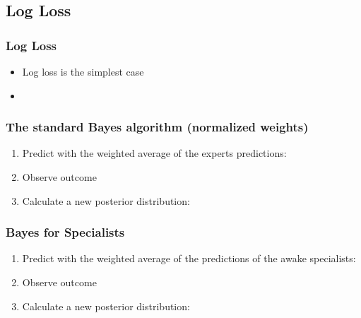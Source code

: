 \documentclass{beamer}
\begin{document}
\subsection{Log Loss}

\begin{frame}
\frametitle{Log Loss}
\begin{itemize}
\item Log loss is the simplest case
\item
\R{\[
\loss(\pred{},\outcome{}) =
  \begin{cases}
          - \ln \pred{}
        & if $\outcome{} = 1$ \cr
           - \ln (1-\pred{})
        & if $\outcome{} = 0$.
  \end{cases}
\]}
\end{itemize}
\end{frame}

\begin{frame}
\frametitle{The standard Bayes algorithm (normalized weights)}
{} 
\begin{enumerate}
 \item Predict with the weighted average of the experts
predictions:\newline
 \item Observe outcome 
 \item Calculate a new posterior distribution:
\R{\[
\pp{i}{t+1} = 
\begin{cases}
            \frac{{\displaystyle \pp{i}{t} \advice{i}{t}}
             }{
             {\displaystyle \pred{t}}}
        & if $\outcome{t}=1$ \cr
\frac{{\displaystyle \pp{i}{t} (1-\advice{i}{t})}}{
            {\displaystyle  1-\pred{t}}}
        & if $\outcome{t}=0$.
\end{cases}
\]}
\end{enumerate}
\end{frame}

\begin{frame}
\frametitle{Bayes for Specialists}
{} 
\begin{enumerate}
 \item Predict with the weighted average of the predictions of the
awake specialists:
 \item Observe outcome  
 \item Calculate a new posterior distribution: \\
  
\R{\[
\pp{i}{t+1} = 
\begin{cases}
            \frac{{\displaystyle \pp{i}{t} \advice{i}{t}}
             }{
             {\displaystyle \pred{t}}}
        & if $\outcome{t}=1$ \cr
           \frac{{\displaystyle \pp{i}{t} (1-\advice{i}{t})}
             }{
            {\displaystyle  1-\pred{t}}}
        & if $\outcome{t}=0$.
\end{cases}
\]}
 
\end{enumerate}
\end{frame}
\end{document}
